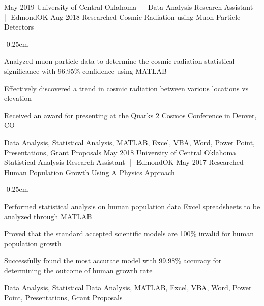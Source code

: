 \begin{experiences}
  \consultantexperience
    {May 2019}       {University of Central Oklahoma\,\, |\,\, Data Analysis Research Assistant\,\, |\,\, Edmond}{OK}{}
    {Aug 2018}    {Researched Cosmic Radiation using Muon Particle Detectors}{} 
     {
       \begin{description}[font=$\bullet$\scshape\bfseries]\small
            \itemsep-0.25em 
             \item Analyzed muon particle data to determine the cosmic radiation statistical significance with 96.95\% confidence using MATLAB
             \item Effectively discovered a trend in cosmic radiation between various locations vs elevation
             \item Received an award for presenting at the Quarks 2 Cosmos Conference in Denver, CO
       \end{description}
     }
                    {Data Analysis, Statistical Analysis, MATLAB, Excel, VBA, Word, Power Point, Presentations, Grant Proposals}
  \emptySeparator
  \consultantexperience
  {May 2018}      {University of Central Oklahoma\,\, |\,\, Statistical Analysis Research Assistant\,\, |\,\, Edmond}{OK}{}
  {May 2017}      {Researched Human Population Growth Using A Physics Approach}{}
       { 
         \begin{description}[font=$\bullet$\scshape\bfseries]\small
            \itemsep-0.25em 
           \item Performed statistical analysis on human population data Excel spreadsheets to be analyzed through MATLAB
           \item Proved that the standard accepted scientific models are 100\% invalid for human population growth
           \item Successfully found the most accurate model with 99.98\% accuracy for determining the outcome of human growth rate 
         \end{description}
       }
       {Data Analysis, Statistical Data Analysis, MATLAB, Excel, VBA, Word, Power Point, Presentations, Grant Proposals}
\end{experiences}
